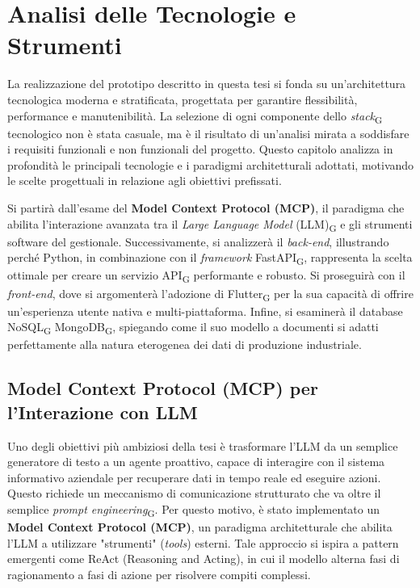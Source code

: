 \chapter{Analisi delle Tecnologie e Strumenti}
\label{ch:tecnologie}

La realizzazione del prototipo descritto in questa tesi si fonda su un'architettura tecnologica moderna e stratificata, progettata per garantire flessibilità, performance e manutenibilità. La selezione di ogni componente dello \textit{stack}\textsubscript{G} tecnologico non è stata casuale, ma è il risultato di un'analisi mirata a soddisfare i requisiti funzionali e non funzionali del progetto. Questo capitolo analizza in profondità le principali tecnologie e i paradigmi architetturali adottati, motivando le scelte progettuali in relazione agli obiettivi prefissati.

Si partirà dall'esame del \textbf{Model Context Protocol (MCP)}, il paradigma che abilita l'interazione avanzata tra il \textit{Large Language Model} (LLM)\textsubscript{G} e gli strumenti software del gestionale. Successivamente, si analizzerà il \textit{back-end}, illustrando perché Python, in combinazione con il \textit{framework} FastAPI\textsubscript{G}, rappresenta la scelta ottimale per creare un servizio API\textsubscript{G} performante e robusto. Si proseguirà con il \textit{front-end}, dove si argomenterà l'adozione di Flutter\textsubscript{G} per la sua capacità di offrire un'esperienza utente nativa e multi-piattaforma. Infine, si esaminerà il database NoSQL\textsubscript{G} MongoDB\textsubscript{G}, spiegando come il suo modello a documenti si adatti perfettamente alla natura eterogenea dei dati di produzione industriale.

\section{Model Context Protocol (MCP) per l'Interazione con LLM}
\label{sec:mcp}

Uno degli obiettivi più ambiziosi della tesi è trasformare l'LLM da un semplice generatore di testo a un agente proattivo, capace di interagire con il sistema informativo aziendale per recuperare dati in tempo reale ed eseguire azioni. Questo richiede un meccanismo di comunicazione strutturato che va oltre il semplice \textit{prompt engineering}\textsubscript{G}. Per questo motivo, è stato implementato un \textbf{Model Context Protocol (MCP)}, un paradigma architetturale che abilita l'LLM a utilizzare "strumenti" (\textit{tools}) esterni. Tale approccio si ispira a pattern emergenti come ReAct (Reasoning and Acting), in cui il modello alterna fasi di ragionamento a fasi di azione per risolvere compiti complessi.

